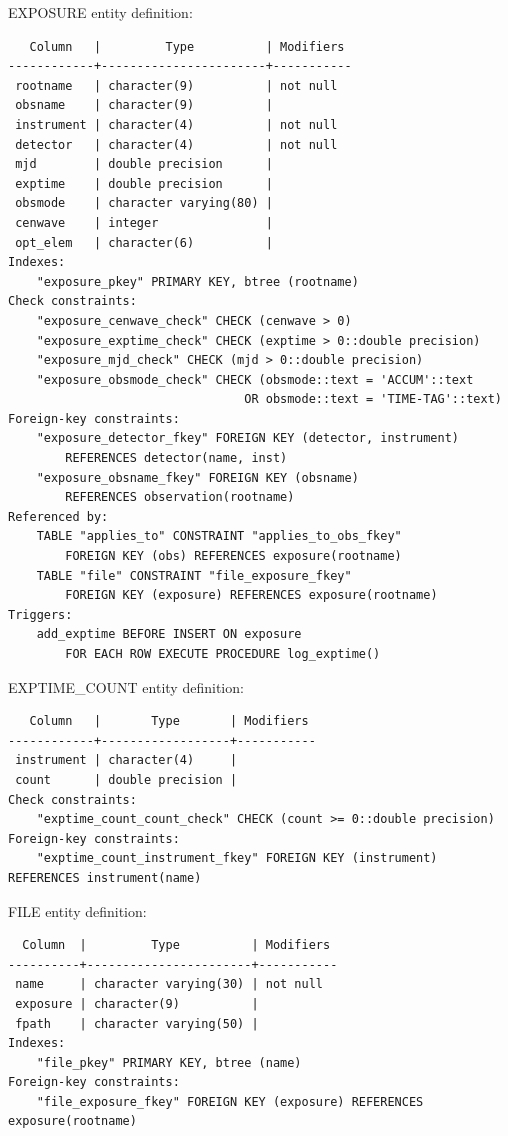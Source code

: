 \documentclass[a4paper,11pt]{article}
\begin{document}
\hrulefill

EXPOSURE entity definition:
\begin{verbatim}
   Column   |         Type          | Modifiers 
------------+-----------------------+-----------
 rootname   | character(9)          | not null
 obsname    | character(9)          | 
 instrument | character(4)          | not null
 detector   | character(4)          | not null
 mjd        | double precision      | 
 exptime    | double precision      | 
 obsmode    | character varying(80) | 
 cenwave    | integer               | 
 opt_elem   | character(6)          | 
Indexes:
    "exposure_pkey" PRIMARY KEY, btree (rootname)
Check constraints:
    "exposure_cenwave_check" CHECK (cenwave > 0)
    "exposure_exptime_check" CHECK (exptime > 0::double precision)
    "exposure_mjd_check" CHECK (mjd > 0::double precision)
    "exposure_obsmode_check" CHECK (obsmode::text = 'ACCUM'::text 
                                 OR obsmode::text = 'TIME-TAG'::text)
Foreign-key constraints:
    "exposure_detector_fkey" FOREIGN KEY (detector, instrument) 
        REFERENCES detector(name, inst)
    "exposure_obsname_fkey" FOREIGN KEY (obsname) 
        REFERENCES observation(rootname)
Referenced by:
    TABLE "applies_to" CONSTRAINT "applies_to_obs_fkey" 
        FOREIGN KEY (obs) REFERENCES exposure(rootname)
    TABLE "file" CONSTRAINT "file_exposure_fkey" 
        FOREIGN KEY (exposure) REFERENCES exposure(rootname)
Triggers:
    add_exptime BEFORE INSERT ON exposure 
        FOR EACH ROW EXECUTE PROCEDURE log_exptime()

\end{verbatim}

\hrulefill

EXPTIME\_COUNT entity definition:
\begin{verbatim}
   Column   |       Type       | Modifiers 
------------+------------------+-----------
 instrument | character(4)     | 
 count      | double precision | 
Check constraints:
    "exptime_count_count_check" CHECK (count >= 0::double precision)
Foreign-key constraints:
    "exptime_count_instrument_fkey" FOREIGN KEY (instrument) REFERENCES instrument(name)
\end{verbatim}

\hrulefill

FILE entity definition:
\begin{verbatim}
  Column  |         Type          | Modifiers 
----------+-----------------------+-----------
 name     | character varying(30) | not null
 exposure | character(9)          | 
 fpath    | character varying(50) | 
Indexes:
    "file_pkey" PRIMARY KEY, btree (name)
Foreign-key constraints:
    "file_exposure_fkey" FOREIGN KEY (exposure) REFERENCES exposure(rootname)
\end{verbatim}
\end{document}
